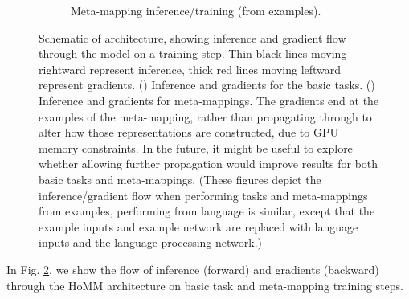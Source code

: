 \begin{figure}[!h]
\begin{subfigure}{\textwidth}
{
}
\caption{Meta-mapping inference/training (from examples).}\label{supp_fig:HoMM:gradient_flow:meta_mappings}
\end{subfigure}
\caption[Schematic of architecture, showing inference and gradient flow through the model on a training step.]{Schematic of architecture, showing inference and gradient flow through the model on a training step. Thin black lines moving rightward represent inference, thick red lines moving leftward represent gradients. () Inference and gradients for the basic tasks. () Inference and gradients for meta-mappings. The gradients end at the examples of the meta-mapping, rather than propagating through to alter how those representations are constructed, due to GPU memory constraints. In the future, it might be useful to explore whether allowing further propagation would improve results for both basic tasks and meta-mappings. (These figures depict the inference/gradient flow when performing tasks and meta-mappings from examples, performing from language is similar, except that the example inputs and example network are replaced with language inputs and the language processing network.)} \label{supp_fig:HoMM:gradient_flow}
\end{figure}

In Fig. \ref{supp_fig:HoMM:gradient_flow}, we show the flow of inference (forward) and gradients (backward) through the HoMM architecture on basic task and meta-mapping training steps.

